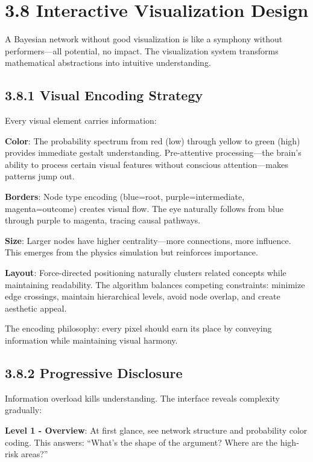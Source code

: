 \documentclass[
  11pt,
  letterpaper,
  openany]{book}
\begin{document}
\section{3.8 Interactive Visualization
Design}\label{sec-visualization-design}

A Bayesian network without good visualization is like a symphony without
performers---all potential, no impact. The visualization system
transforms mathematical abstractions into intuitive understanding.

\subsection{3.8.1 Visual Encoding Strategy}\label{sec-visual-encoding}

Every visual element carries information:

\textbf{Color}: The probability spectrum from red (low) through yellow
to green (high) provides immediate gestalt understanding. Pre-attentive
processing---the brain's ability to process certain visual features
without conscious attention---makes patterns jump out.

\textbf{Borders}: Node type encoding (blue=root, purple=intermediate,
magenta=outcome) creates visual flow. The eye naturally follows from
blue through purple to magenta, tracing causal pathways.

\textbf{Size}: Larger nodes have higher centrality---more connections,
more influence. This emerges from the physics simulation but reinforces
importance.

\textbf{Layout}: Force-directed positioning naturally clusters related
concepts while maintaining readability. The algorithm balances competing
constraints: minimize edge crossings, maintain hierarchical levels,
avoid node overlap, and create aesthetic appeal.

The encoding philosophy: every pixel should earn its place by conveying
information while maintaining visual harmony.

\subsection{3.8.2 Progressive
Disclosure}\label{sec-progressive-disclosure}

Information overload kills understanding. The interface reveals
complexity gradually:

\textbf{Level 1 - Overview}: At first glance, see network structure and
probability color coding. This answers: ``What's the shape of the
argument? Where are the high-risk areas?''
\end{document}
